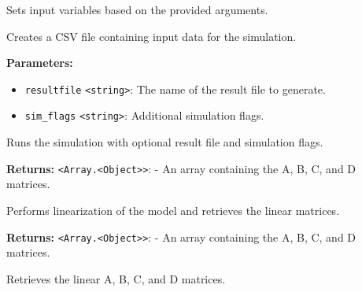 \documentclass[12pt,a4paper]{article}
\begin{document}
\noindent Sets input variables based on the provided arguments.

\vspace{5mm}
\noindent {}


\noindent Creates a CSV file containing input data for the simulation.

\vspace{5mm}
\noindent {}


\noindent \textbf{Parameters:}
\begin{itemize}
  \item \texttt{resultfile} \texttt{<string>}: The name of the result file to generate.
  \item \texttt{sim\_flags} \texttt{<string>}: Additional simulation flags.
\end{itemize}

\noindent Runs the simulation with optional result file and simulation flags.

\vspace{5mm}
\noindent {}


\noindent \textbf{Returns:} \texttt{<Array.<Object>>}: - An array containing the A, B, C, and D matrices.

\noindent Performs linearization of the model and retrieves the linear matrices.

\vspace{5mm}
\noindent {}


\noindent \textbf{Returns:} \texttt{<Array.<Object>>}: - An array containing the A, B, C, and D matrices.

\noindent Retrieves the linear A, B, C, and D matrices.

\vspace{5mm}
\noindent {}
\end{document}
